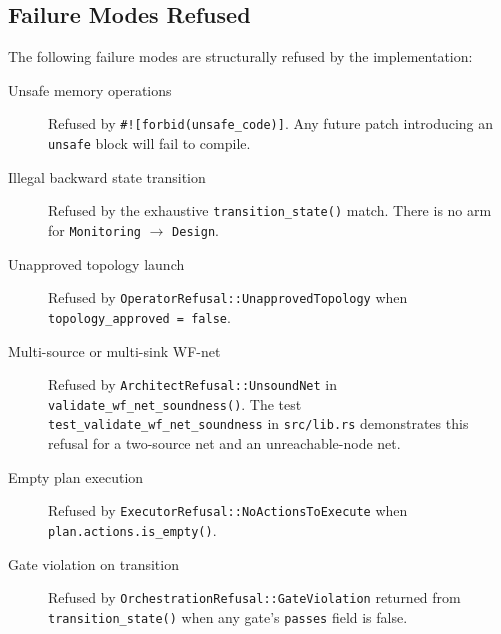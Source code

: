 \subsection{Failure Modes Refused}
\label{sec:blue-river-dam-architecture-failures}

The following failure modes are structurally refused by the implementation:

\begin{description}
  \item[Unsafe memory operations] Refused by \texttt{\#![forbid(unsafe\_code)]}.
    Any future patch introducing an \texttt{unsafe} block will fail to compile.
  \item[Illegal backward state transition] Refused by the exhaustive
    \texttt{transition\_state()} match. There is no arm for
    \texttt{Monitoring} $\to$ \texttt{Design}.
  \item[Unapproved topology launch] Refused by
    \texttt{OperatorRefusal::UnapprovedTopology} when \texttt{topology\_approved
    = false}.
  \item[Multi-source or multi-sink WF-net] Refused by
    \texttt{ArchitectRefusal::UnsoundNet} in
    \texttt{validate\_wf\_net\_soundness()}. The test
    \texttt{test\_validate\_wf\_net\_soundness} in \texttt{src/lib.rs}
    demonstrates this refusal for a two-source net and an unreachable-node net.
  \item[Empty plan execution] Refused by
    \texttt{ExecutorRefusal::NoActionsToExecute} when
    \texttt{plan.actions.is\_empty()}.
  \item[Gate violation on transition] Refused by
    \texttt{OrchestrationRefusal::GateViolation} returned from
    \texttt{transition\_state()} when any gate's \texttt{passes} field is
    false.
\end{description}
